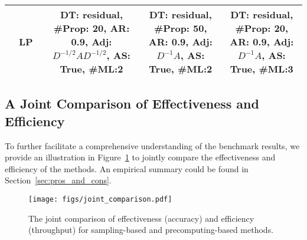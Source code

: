 \message{ !name(main.tex)}\documentclass{article}
\begin{document}
\begin{table}[!ht]
{\begin{tabular}{llccc}
			\cmidrule(lr){2-5}
			                            & LP~\citep{huang2020combining, zhu2005semi} & \makecell{DT: residual, \#Prop: 20, AR: 0.9,                          \\ Adj: \(D^{-1/2}AD^{-1/2}\), AS: True, \#ML:2} & \makecell{DT: residual, \#Prop: 50, AR: 0.9, \\ Adj: \(D^{-1}A\), AS: True, \#ML:2} & \makecell{DT: residual, \#Prop: 20, AR: 0.9, \\ Adj: \(D^{-1}A\), AS: True, \#ML:3} \\
			\bottomrule
		\end{tabular}
	}
	\vspace{-3mm}
	\label{tab:seached_hp_for_all_methods}
\end{table}

\subsection{A Joint Comparison of Effectiveness and Efficiency}\label{app:joint_comparison}
To further facilitate a comprehensive understanding of the benchmark results, we provide an illustration in Figure~\ref{fig:joint_comparison} to jointly compare the effectiveness and efficiency of the methods. An empirical summary could be found in Section~\ref{sec:pros_and_cons}.
\begin{figure}[!ht]
	\centering
	\texttt{[image: figs/joint\_comparison.pdf]}
	\caption{The joint comparison of effectiveness (accuracy) and efficiency (throughput) for sampling-based and precomputing-based methods.}
	\label{fig:joint_comparison}
	\vspace{-3mm}
\end{figure}
\vspace{-3mm}
\end{document}
